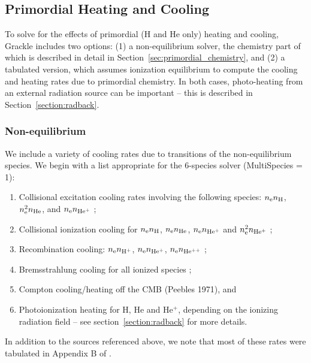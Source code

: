 
\subsection{Primordial Heating and Cooling}

To solve for the effects of primordial (H and He only) heating and cooling, Grackle includes two options: (1) a non-equilibrium solver, the chemistry part of which is described in detail in Section~\ref{sec:primordial_chemistry}, and (2) a tabulated version, which assumes ionization equilibrium to compute the cooling and heating rates due to primordial chemistry.  In both cases, photo-heating from an external radiation source can be important -- this is described in Section~\ref{section:radback}.

\subsubsection{Non-equilibrium} \label{sec:pri-neq}

We include a variety of cooling rates due to transitions of the non-equilibrium species.  We begin with a list appropriate for the 6-species solver (MultiSpecies = 1): 

\begin{enumerate}
\item Collisional excitation cooling rates involving the following species: $n_{\rm e} n_{\rm H}$, $n_{\rm e}^2 n_{\rm He}$, and $n_{\rm e} n_{\rm He^+}$ \citep{1981MNRAS.197..553B, 1992ApJS...78..341C};
\item Collisional ionization cooling for $n_{\rm e} n_{\rm H}$, $n_{\rm e} n_{\rm He}$, $n_{\rm e} n_{\rm He^+}$ and $n_{\rm e}^2 n_{\rm He^+}$ \citep{1987ApJ...318...32S, 1992ApJS...78..341C, 1997NewA....2..181A};
\item Recombination cooling: $n_{\rm e} n_{\rm H^+}$, $n_{\rm e} n_{\rm He^+}$, $n_{\rm e} n_{\rm He^{++}}$ \citep{1981MNRAS.197..553B, 1978ppim.book.....S};
\item Bremsstrahlung cooling for all ionized species \citep{1981MNRAS.197..553B};
\item Compton cooling/heating off the CMB (Peebles 1971), and 
\item Photoionization heating for H, He and He$^+$, depending on the ionizing radiation field -- see section~\ref{section:radback} for more details.
\end{enumerate}
In addition to the sources referenced above, we note that most of these rates were tabulated in Appendix B of \citet{1997NewA....2..209A}.

